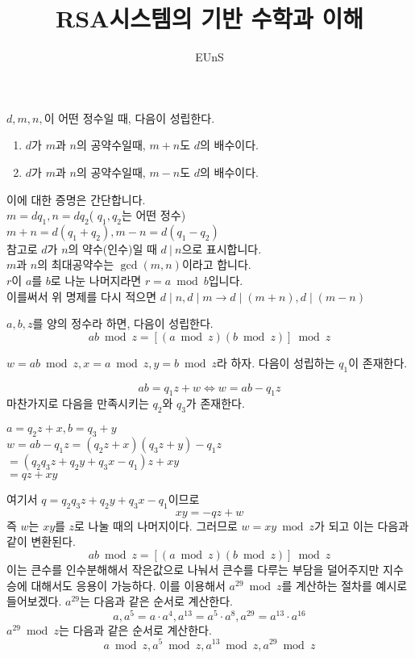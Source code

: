 \documentclass{oblivoir}
\begin{document}
\title{RSA시스템의 기반 수학과 이해}
\author{ EUnS }
\maketitle

\chapter{}
\begin{justbox}
$d,m,n,$이 어떤 정수일 때, 다음이 성립한다.
\begin{enumerate}
    \item $d$가 $m$과 $n$의 공약수일때, $m+n$도 $d$의 배수이다.
    \item $d$가 $m$과 $n$의 공약수일때, $m-n$도 $d$의 배수이다.     
\end{enumerate}
\end{justbox}
이에 대한 증명은 간단합니다. \\
$m=dq_1 , n = dq_2$( $q_1,q_2$는 어떤 정수)\\
$m+n = d(q_1 + q_2) , m-n=d(q_1-q_2)$ \\
참고로 $d$가 $n$의 약수(인수)일 때 $d\: |\: n$으로 표시합니다.\\
$m$과 $n$의 최대공약수는 $\gcd(m,n)$이라고 합니다.\\
$r$이 $a$를 $b$로 나눈 나머지라면  $r=a\bmod b$입니다. \\
이를써서 위 명제를 다시 적으면 $d\mid n , d\mid m  \longrightarrow d \mid (m+n), d\mid (m-n)$

\newpage

\begin{justbox}
$a,b,z$를 양의 정수라 하면, 다음이 성립한다.
\[ ab\bmod z= [(a\bmod z)(b \bmod z)]\bmod z \]
\end{justbox}

$w = ab\bmod z, x =a \bmod z, y=b\bmod z$라 하자.
다음이 성립하는 $q_1$이 존재한다.

\[ab=q_1z+w \Longleftrightarrow w=ab-q_1 z \]
마찬가지로 다음을 만족시키는 $q_2$와 $q_3$가 존재한다.
\begin{center}
    $a=q_2 z + x , b=q_3 +y$\\
    $w = ab-q_1 z = (q_2z+x)(q_3z+y)-q_1z$\\ $=(q_2q_3z+q_2y+q_3x-q_1)z+xy$\\
    $=qz+xy$
\end{center}
여기서 $q=q_2q_3z+q_2y+q_3x-q_1$이므로 
    \[xy=-qz+w\]
즉 $w$는 $xy$를 $z$로 나눌 때의 나머지이다. 그러므로 $w=xy \bmod z$가 되고 이는 다음과 같이 변환된다.
     \[ab\bmod z= [(a\bmod z)(b \bmod z)]\bmod z\]
이는 큰수를 인수분해해서 작은값으로 나눠서 큰수를 다루는 부담을 덜어주지만 지수승에 대해서도 응용이 가능하다.
이를 이용해서 $a^{29}\bmod z$를 계산하는 절차를 예시로 들어보겠다. $a^{29}$는 다음과 같은 순서로 계산한다.
   \[ a , a^{5}=a \cdot a^4, a^{13}=a^{5}\cdot a^{8}, a^{29}=a^{13}\cdot a^{16} \]
$a^{29} \bmod z$는 다음과 같은 순서로 계산한다.
    \[a \bmod z , a^{5}\bmod z, a^{13}\bmod z, a^{29}\bmod z\]
\end{document}
